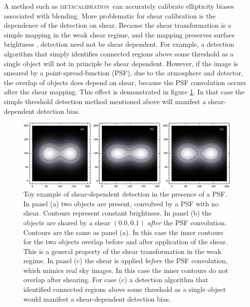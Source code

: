 \documentclass[fleqn,useAMS,usenatbib]{mnras}
\newcommand{\mcal}{\textsc{metacalibration}}
\begin{document}
A method such as \mcal\ can accurately calibrate ellipticity biases associated
with blending.  More problematic for shear calibration is the dependence of the
detection on shear.  Because the shear transformation is a simple mapping in
the weak shear regime, and the mapping preserves surface brightness
\citep{SchneiderBook92}, detection need not be shear dependent.  For example, a
detection algorithm that simply identifies connected regions above some
threshold as a single object will not in principle be shear dependent. However,
if the image is smeared by a point-spread-function (PSF), due to the atmosphere
and detector, the overlap of objects does depend on shear, because the PSF
convolution occurs after the shear mapping.  This effect is demonstrated in
figure \ref{fig:toy}.  In that case the simple threshold detection method
mentioned above will manifest a shear-dependent detection bias.

\begin{figure}
    \includegraphics[width=\textwidth]{figures/toy.png}

    \caption{ Toy example of shear-dependent detection in the presence of a
    PSF.  In panel (a) two objects are present, convolved by a PSF with no
    shear.  Contours represent constant brightness.  In panel (b) the objects
    are shared by a shear $(0.0, 0.1)$ {\em after} the PSF convolution.
    Contours are the same as panel (a).  In this case the inner contours for
    the two objects overlap before and after application of the shear.  This is
    a general property of the shear transformation in the weak regime.   In
    panel (c) the shear is applied {\em before} the PSF convolution, which
    mimics real sky images.  In this case the inner contours do not overlap
    after shearing.  For case (c) a detection algorithm that identified
    connected regions above some threshold as a single object would manifest a
    shear-dependent detection bias.  \label{fig:toy} }

\end{figure}
\end{document}
